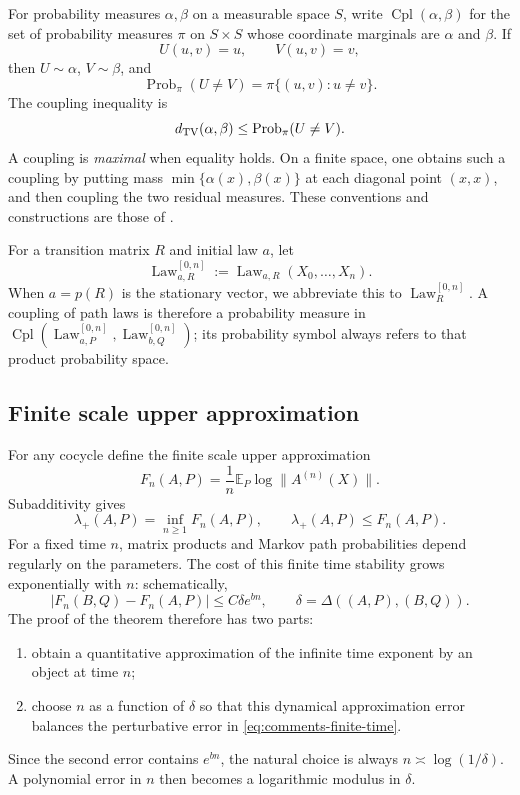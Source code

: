 \documentclass[11pt,a4paper]{amsart}
\theoremstyle{definition}
\theoremstyle{remark}
\numberwithin{equation}{section}
\newcommand{\EE}{\mathbb E}
\newcommand{\Prob}{\operatorname{Prob}}
\newcommand{\Law}{\operatorname{Law}}
\newcommand{\Cpl}{\operatorname{Cpl}}
\newcommand{\1}{\boldsymbol 1}
\begin{document}
For probability measures $\alpha,\beta$ on a measurable space
$S$, write $\Cpl(\alpha,\beta)$ for the set of probability
measures $\pi$ on $S\times S$ whose coordinate marginals are
$\alpha$ and $\beta$.  If
$$
 U(u,v)=u,\qquad V(u,v)=v,
$$
then $U\sim\alpha$, $V\sim\beta$, and
\begin{equation}\label{eq:coupling-disagreement-event}
 \Prob_\pi(U\ne V)
 =\pi\{(u,v):u\ne v\}.
\end{equation}
The coupling inequality is
\begin{equation}\label{eq:coupling-inequality-intro}
 d_{\rm TV}(\alpha,\beta)
 \le \Prob_\pi(U\ne V).
\end{equation}
A coupling is \emph{maximal} when equality holds.  On a finite space,
one obtains such a coupling by putting mass
$\min\{\alpha(x),\beta(x)\}$ at each diagonal point $(x,x)$,
and then coupling the two residual measures.  These conventions and
constructions are those of
\cite[Definition~4.1.1 and Lemmas~4.1.11, 4.1.13]{Roch}.

For a transition matrix $R$ and initial law $a$, let
\begin{equation}\label{eq:path-law-notation}
 \Law_{a,R}^{[0,n]}
 :=\Law_{a,R}(X_0,\ldots,X_n).
\end{equation}
When $a=p(R)$ is the stationary vector, we abbreviate this to
$\Law_R^{[0,n]}$.  A coupling of path laws is therefore a probability
measure in
$\Cpl(\Law_{a,P}^{[0,n]},\Law_{b,Q}^{[0,n]})$; its probability
symbol always refers to that product probability space.


\subsection{Finite scale upper approximation}
%
For any cocycle define the finite scale upper approximation
$$
 F_n(A,P)=\frac1n\EE_P\log\|A^{(n)}(X)\|.
$$
Subadditivity gives
$$
 \lambda_+(A,P)=\inf_{n\ge1}F_n(A,P),
 \qquad
 \lambda_+(A,P)\le F_n(A,P).
$$
For a fixed time $n$, matrix products and Markov path probabilities
depend regularly on the parameters.  The cost of this finite time
stability grows exponentially with $n$: schematically,
\begin{equation}\label{eq:comments-finite-time}
 |F_n(B,Q)-F_n(A,P)|\le C\delta e^{bn},
 \qquad
 \delta=\Delta((A,P),(B,Q)).
\end{equation}
The proof of the theorem therefore has two parts:
\begin{enumerate}[label=\textup{(\arabic*)}]
\item obtain a quantitative approximation of the infinite time
      exponent by an object at time $n$;
\item choose $n$ as a function of $\delta$ so that this dynamical
      approximation error balances the perturbative error in
      \eqref{eq:comments-finite-time}.
\end{enumerate}
Since the second error contains $e^{bn}$, the natural choice is
always $n\asymp\log(1/\delta)$.  A polynomial error in $n$ then
becomes a logarithmic modulus in $\delta$.%
\end{document}

